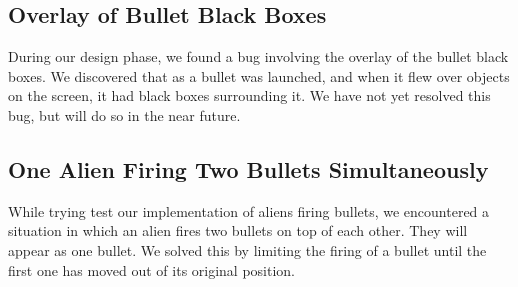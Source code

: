 \documentclass[11pt,letter,oneside]{report}
\begin{document}
\subsection{Overlay of Bullet Black Boxes}
During our design phase, we found a bug involving the overlay of the bullet black boxes. We discovered that as a bullet was launched, and when it flew over objects on the screen, it had black boxes surrounding it. We have not yet resolved this bug, but will do so in the near future.

\subsection{One Alien Firing Two Bullets Simultaneously}
While trying test our implementation of aliens firing bullets, we encountered a situation in which an alien fires two bullets on top of each other.  They will appear as one bullet.  We solved this by limiting the firing of a bullet until the first one has moved out of its original position. 
\end{document}
